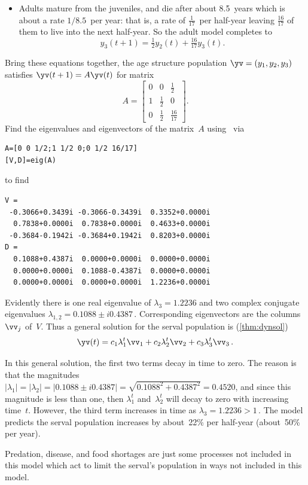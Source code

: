 \begin{example}
\begin{solution}
\begin{itemize}
\item Adults mature from the juveniles, and die after about 8.5~years which is about a rate \(1/8.5\)~per year: that is, a rate of \(\frac1{17}\)~per half-year leaving \(\tfrac{16}{17}\) of them to live into the next half-year.
So the adult model completes to 
\begin{equation*}
y_3(t+1)=\tfrac12y_2(t)+\tfrac{16}{17}y_3(t).
\end{equation*}

\end{itemize}

Bring these equations together, the age structure population \(\yv=(y_1,y_2,y_3)\) satisfies \(\yv(t+1)=A\yv(t)\) for matrix
\begin{equation*}
A=\begin{bmatrix} 0&0&\frac1{2}
\\1&\frac12&0
\\0&\frac12&\frac{16}{17} \end{bmatrix}.
\end{equation*}
Find the eigenvalues and eigenvectors of the matrix~\(A\) using \script\ via
\begin{verbatim}
A=[0 0 1/2;1 1/2 0;0 1/2 16/17]
[V,D]=eig(A)
\end{verbatim}
\setbox\ajrqrbox\hbox{}%
\marginpar{\usebox{\ajrqrbox}}%
to find
\begin{verbatim}
V =
 -0.3066+0.3439i -0.3066-0.3439i  0.3352+0.0000i
  0.7838+0.0000i  0.7838+0.0000i  0.4633+0.0000i
 -0.3684-0.1942i -0.3684+0.1942i  0.8203+0.0000i
D =
  0.1088+0.4387i  0.0000+0.0000i  0.0000+0.0000i
  0.0000+0.0000i  0.1088-0.4387i  0.0000+0.0000i
  0.0000+0.0000i  0.0000+0.0000i  1.2236+0.0000i
\end{verbatim}
Evidently there is one real eigenvalue of \(\lambda_3=1.2236\) and two complex conjugate eigenvalues \(\lambda_{1,2}=0.1088\pm i0.4387\)\,.
Corresponding eigenvectors are the columns~\(\vv_j\) of~\(V\).
Thus a general solution for the serval population is (\autoref{thm:dynsol})
\begin{equation*}
\yv(t)=c_1\lambda_1^t\vv_1+c_2\lambda_2^t\vv_2+c_3\lambda_3^t\vv_3\,.
\end{equation*}

In this general solution, the first two terms decay in time to zero.
The reason is that the magnitudes \(|\lambda_1|=|\lambda_2|=|0.1088\pm i0.4387|=\sqrt{0.1088^2+0.4387^2}=0.4520\), and since this magnitude is less than one, then \(\lambda_1^t\) and~\(\lambda_2^t\) will decay to zero with increasing time~\(t\).
However, the third term increases in time as \(\lambda_3=1.2236>1\)\,.
The model predicts the serval population increases by about~22\% per half-year (about~50\% per year).
\end{solution} 
Predation, disease, and food shortages are just some processes not included in this model which act to limit the serval's population in ways not included in this model.
\end{example}





